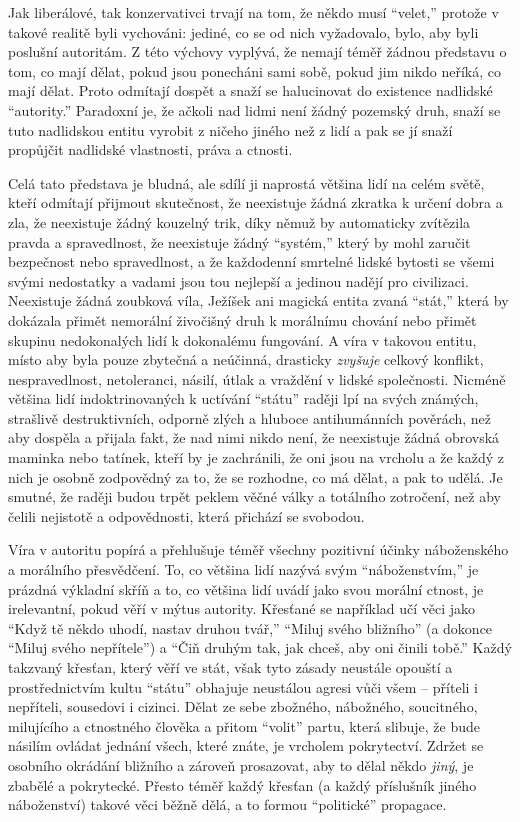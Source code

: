 \documentclass{book}
\begin{document}
Jak liberálové, tak konzervativci trvají na tom, že někdo musí \enquote{velet,} protože v takové realitě byli vychováni: jediné, co se od nich vyžadovalo, bylo, aby byli poslušní autoritám. Z této výchovy vyplývá, že nemají téměř žádnou představu o tom, co mají dělat, pokud jsou ponecháni sami sobě, pokud jim nikdo neříká, co mají dělat. Proto odmítají dospět a snaží se halucinovat do existence nadlidské \enquote{autority.} Paradoxní je, že ačkoli nad lidmi není žádný pozemský druh, snaží se tuto nadlidskou entitu vyrobit z ničeho jiného než z lidí a pak se jí snaží propůjčit nadlidské vlastnosti, práva a ctnosti.

Celá tato představa je bludná, ale sdílí ji naprostá většina lidí na celém světě, kteří odmítají přijmout skutečnost, že neexistuje žádná zkratka k určení dobra a zla, že neexistuje žádný kouzelný trik, díky němuž by automaticky zvítězila pravda a spravedlnost, že neexistuje žádný \enquote{systém,} který by mohl zaručit bezpečnost nebo spravedlnost, a že každodenní smrtelné lidské bytosti se všemi svými nedostatky a vadami jsou tou nejlepší a jedinou nadějí pro civilizaci. Neexistuje žádná zoubková víla, Ježíšek ani magická entita zvaná \enquote{stát,} která by dokázala přimět nemorální živočišný druh k morálnímu chování nebo přimět skupinu nedokonalých lidí k dokonalému fungování. A víra v takovou entitu, místo aby byla pouze zbytečná a neúčinná, drasticky \emph{zvyšuje} celkový konflikt, nespravedlnost, netoleranci, násilí, útlak a vraždění v lidské společnosti. Nicméně většina lidí indoktrinovaných k uctívání \enquote{státu} raději lpí na svých známých, strašlivě destruktivních, odporně zlých a hluboce antihumánních pověrách, než aby dospěla a přijala fakt, že nad nimi nikdo není, že neexistuje žádná obrovská maminka nebo tatínek, kteří by je zachránili, že oni jsou na vrcholu a že každý z nich je osobně zodpovědný za to, že se rozhodne, co má dělat, a pak to udělá. Je smutné, že raději budou trpět peklem věčné války a totálního zotročení, než aby čelili nejistotě a odpovědnosti, která přichází se svobodou.

Víra v autoritu popírá a přehlušuje téměř všechny pozitivní účinky náboženského a morálního přesvědčení. To, co většina lidí nazývá svým \enquote{náboženstvím,} je prázdná výkladní skříň a to, co většina lidí uvádí jako svou morální ctnost, je irelevantní, pokud věří v mýtus autority. Křesťané se například učí věci jako \enquote{Když tě někdo uhodí, nastav druhou tvář,} \enquote{Miluj svého bližního} (a dokonce \enquote{Miluj svého nepřítele}) a \enquote{Čiň druhým tak, jak chceš, aby oni činili tobě.} Každý takzvaný křesťan, který věří ve stát, však tyto zásady neustále opouští a prostřednictvím kultu \enquote{státu} obhajuje neustálou agresi vůči všem -- příteli i nepříteli, sousedovi i cizinci. Dělat ze sebe zbožného, nábožného, soucitného, milujícího a ctnostného člověka a přitom \enquote{volit} partu, která slibuje, že bude násilím ovládat jednání všech, které znáte, je vrcholem pokrytectví. Zdržet se osobního okrádání bližního a zároveň prosazovat, aby to dělal někdo \emph{jiný}, je zbabělé a pokrytecké. Přesto téměř každý křesťan (a každý příslušník jiného náboženství) takové věci běžně dělá, a to formou \enquote{politické} propagace.
\end{document}
